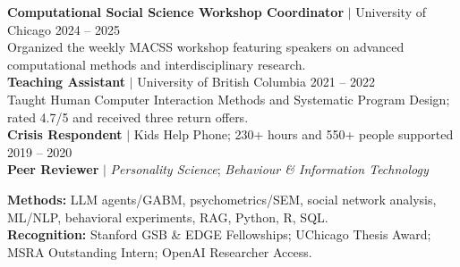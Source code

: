 \documentclass[10pt,letterpaper]{article}
\begin{document}
{\small
\noindent\textbf{Computational Social Science Workshop Coordinator} $|$ University of Chicago \hfill 2024 -- 2025\\[-0.05em]
Organized the weekly MACSS workshop featuring speakers on advanced computational methods and interdisciplinary research.\\[0.18em]
\textbf{Teaching Assistant} $|$ University of British Columbia \hfill 2021 -- 2022\\[-0.05em]
Taught Human Computer Interaction Methods and Systematic Program Design; rated 4.7/5 and received three return offers.\\[0.18em]
\textbf{Crisis Respondent} $|$ Kids Help Phone; 230+ hours and 550+ people supported \hfill 2019 -- 2020\\[0.18em]
\textbf{Peer Reviewer} $|$ \textit{Personality Science}; \textit{Behaviour \& Information Technology}
}

\vspace{0.1em}
{\small
\noindent\textcolor{linkblue}{\textbf{Methods:}} LLM agents/GABM, psychometrics/SEM, social network analysis, ML/NLP, behavioral experiments, RAG, Python, R, SQL.\\
{\scriptsize\textcolor{linkblue}{\textbf{Recognition:}} Stanford GSB \& EDGE Fellowships; UChicago Thesis Award; MSRA Outstanding Intern; OpenAI Researcher Access.}
}
\end{document}
